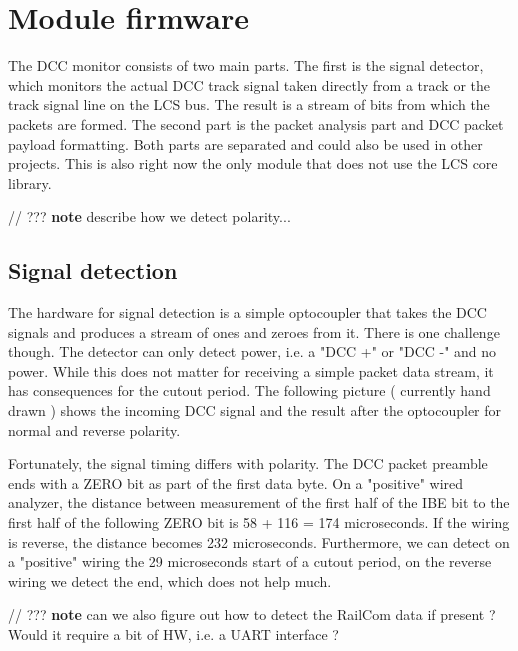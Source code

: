 \section{Module firmware}

The DCC monitor consists of two main parts. The first is the signal detector, which monitors the actual DCC track signal taken directly from a track or the track signal line on the LCS bus. The result is a stream of bits from which the packets are formed. The second part is the packet analysis part and DCC packet payload formatting. Both parts are separated and could also be used in other projects. This is also right now the only module that does not use the LCS core library.

// ??? \textbf{note} describe how we detect polarity...

\subsection{Signal detection}

The hardware for signal detection is a simple optocoupler that takes the DCC signals and produces a stream of ones and zeroes from it. There is one challenge though. The detector can only detect power, i.e. a "DCC +" or "DCC -" and no power. While this does not matter for receiving a simple packet data stream, it has consequences for the cutout period. The following picture ( currently hand drawn ) shows the incoming DCC signal and the result after the optocoupler for normal and reverse polarity.


Fortunately, the signal timing differs with polarity. The DCC packet preamble ends with a ZERO bit as part of the first data byte. On a "positive" wired analyzer, the distance between measurement of the first half of the IBE bit to the first half of the following ZERO bit is 58 + 116 = 174 microseconds. If the wiring is reverse, the distance becomes 232 microseconds. Furthermore, we can detect on a "positive" wiring the 29 microseconds start of a cutout period, on the reverse wiring we detect the end, which does not help much.

// ??? \textbf{note} can we also figure out how to detect the RailCom data if present ? Would it require a bit of HW, i.e. a UART interface ?

